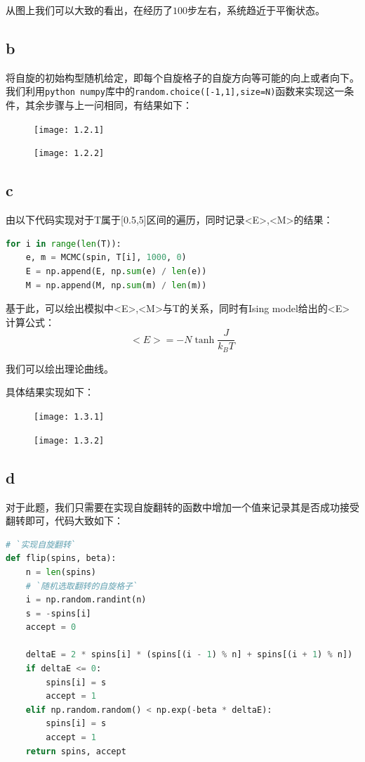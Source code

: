 \documentclass[UTF8]{ctexart}
\begin{document}
    从图上我们可以大致的看出，在经历了\(100\)步左右，系统趋近于平衡状态。

    \subsection{b}\label{subsec:1.2}
    将自旋的初始构型随机给定，即每个自旋格子的自旋方向等可能的向上或者向下。我们利用\texttt{python numpy}库中的\texttt{random.choice([-1,1],size=N)}函数来实现这一条件，其余步骤与上一问相同，有结果如下：

    \begin{figure}[h]
        \centering
        \texttt{[image: 1.2.1]}
        \label{fig:1.2.1}
    \end{figure}
    \begin{figure}[h]
        \centering
        \texttt{[image: 1.2.2]}
        \label{fig:1.2.2}
    \end{figure}

    \subsection{c}\label{subsec:1.3}
    由以下代码实现对于T属于[0.5,5]区间的遍历，同时记录<E>,<M>的结果：
    \begin{lstlisting}[language=Python, breaklines = true,label={lst:1.3}]
for i in range(len(T)):
    e, m = MCMC(spin, T[i], 1000, 0)
    E = np.append(E, np.sum(e) / len(e))
    M = np.append(M, np.sum(m) / len(m))
    \end{lstlisting}

    基于此，可以绘出模拟中<E>,<M>与T的关系，同时有Ising model给出的<E>计算公式：
    \begin{equation*}
        <E> =-N\tanh{\frac{J}{k_B T}}
    \end{equation*}

    我们可以绘出理论曲线。

    具体结果实现如下：
    \begin{figure}[h]
        \centering
        \texttt{[image: 1.3.1]}
        \label{fig:1.3.1}
    \end{figure}
    \begin{figure}[h]
        \centering
        \texttt{[image: 1.3.2]}
        \label{fig:1.3.2}
    \end{figure}

    \subsection{d}\label{subsec:1.4}
    对于此题，我们只需要在实现自旋翻转的函数中增加一个值来记录其是否成功接受翻转即可，代码大致如下：
    \begin{lstlisting}[language=Python, breaklines = true,label={lst:1.4}]
# `实现自旋翻转`
def flip(spins, beta):
    n = len(spins)
    # `随机选取翻转的自旋格子`
    i = np.random.randint(n)
    s = -spins[i]
    accept = 0

    deltaE = 2 * spins[i] * (spins[(i - 1) % n] + spins[(i + 1) % n])
    if deltaE <= 0:
        spins[i] = s
        accept = 1
    elif np.random.random() < np.exp(-beta * deltaE):
        spins[i] = s
        accept = 1
    return spins, accept
    \end{lstlisting}
\end{document}
